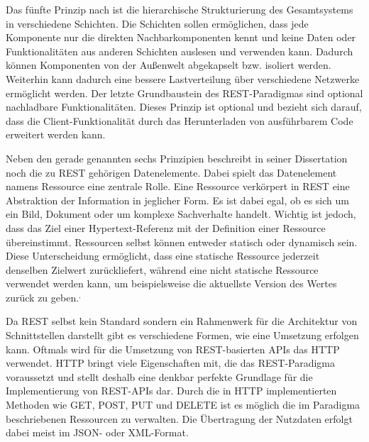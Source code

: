 Das fünfte Prinzip nach \citeauthor{MS-Fielding.} ist die hierarchische Strukturierung des Gesamtsystems in verschiedene Schichten. 
Die Schichten sollen ermöglichen, dass jede Komponente nur die direkten Nachbarkomponenten kennt und keine Daten oder Funktionalitäten aus anderen Schichten auslesen und verwenden kann.
Dadurch können Komponenten von der Außenwelt abgekapselt bzw. isoliert werden.
Weiterhin kann dadurch eine bessere Lastverteilung über verschiedene Netzwerke ermöglicht werden.
Der letzte Grundbaustein des \ac{REST}-Paradigmas sind optional nachladbare Funktionalitäten.
Dieses Prinzip ist optional und bezieht sich darauf, dass die Client-Funktionalität durch das Herunterladen von ausführbarem Code erweitert werden kann. 

Neben den gerade genannten sechs Prinzipien beschreibt \citeauthor{MS-Fielding.} in seiner Dissertation noch die zu \ac{REST} gehörigen Datenelemente. 
Dabei spielt das Datenelement namens Ressource eine zentrale Rolle.
Eine Ressource verkörpert in \ac{REST} eine Abstraktion der Information in jeglicher Form.
Es ist dabei egal, ob es sich um ein Bild, Dokument oder um komplexe Sachverhalte handelt. 
Wichtig ist jedoch, dass das Ziel einer Hypertext-Referenz mit der Definition einer Ressource übereinstimmt.
Ressourcen selbst können entweder statisch oder dynamisch sein.
Diese Unterscheidung ermöglicht, dass eine statische Ressource jederzeit denselben Zielwert zurückliefert, während eine nicht statische Ressource verwendet werden kann, um beispielsweise die aktuellste Version des Wertes zurück zu geben.\autocite[Vgl.][S. 86-90]{MS-Fielding.}$^,$\autocite{rf-richardson2013restful}

Da \ac{REST} selbst kein Standard sondern ein Rahmenwerk für die Architektur von Schnittstellen darstellt gibt es verschiedene Formen, wie eine Umsetzung erfolgen kann. 
Oftmals wird für die Umsetzung von \ac{REST}-basierten \acp{API} das \ac{HTTP} verwendet.
\ac{HTTP} bringt viele Eigenschaften mit, die das \ac{REST}-Paradigma voraussetzt und stellt deshalb eine denkbar perfekte Grundlage für die Implementierung von \ac{REST}-\acp{API} dar. 
Durch die in \ac{HTTP} implementierten Methoden wie GET, POST, PUT und DELETE ist es möglich die im Paradigma beschriebenen Ressourcen zu verwalten.
Die Übertragung der Nutzdaten erfolgt dabei meist im \ac{JSON}- oder \ac{XML}-Format.\autocite[Vgl.][S. 97]{MS-Tilkov.2015} 

